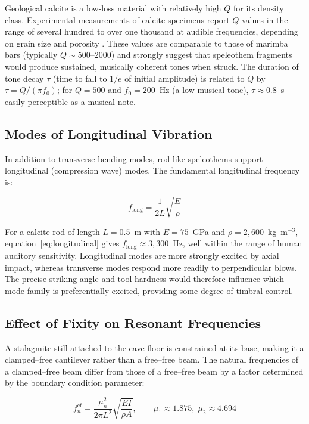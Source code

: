 \documentclass[12pt]{article}
\begin{document}
Geological calcite is a low-loss material with relatively high $Q$ for its density class. Experimental measurements of calcite specimens report $Q$ values in the range of several hundred to over one thousand at audible frequencies, depending on grain size and porosity \citep{Manghnani1974}. These values are comparable to those of marimba bars (typically $Q \sim 500$--$2000$) and strongly suggest that speleothem fragments would produce sustained, musically coherent tones when struck. The duration of tone decay $\tau$ (time to fall to $1/e$ of initial amplitude) is related to $Q$ by $\tau = Q / (\pi f_0)$; for $Q = 500$ and $f_0 = 200$~Hz (a low musical tone), $\tau \approx 0.8$~s—easily perceptible as a musical note.

\subsection{Modes of Longitudinal Vibration}

In addition to transverse bending modes, rod-like speleothems support longitudinal (compression wave) modes. The fundamental longitudinal frequency is:

\begin{equation}
f_{\text{long}} = \frac{1}{2L}\sqrt{\frac{E}{\rho}} \label{eq:longitudinal}
\end{equation}

For a calcite rod of length $L = 0.5$~m with $E = 75$~GPa and $\rho = 2{,}600$~kg~m$^{-3}$, equation~\eqref{eq:longitudinal} gives $f_{\text{long}} \approx 3{,}300$~Hz, well within the range of human auditory sensitivity. Longitudinal modes are more strongly excited by axial impact, whereas transverse modes respond more readily to perpendicular blows. The precise striking angle and tool hardness would therefore influence which mode family is preferentially excited, providing some degree of timbral control.

\subsection{Effect of Fixity on Resonant Frequencies}

A stalagmite still attached to the cave floor is constrained at its base, making it a clamped--free cantilever rather than a free--free beam. The natural frequencies of a clamped--free beam differ from those of a free--free beam by a factor determined by the boundary condition parameter:

\begin{equation}
f_n^{\text{cf}} = \frac{\mu_n^2}{2\pi L^2}\sqrt{\frac{EI}{\rho A}}, \qquad \mu_1 \approx 1.875,\; \mu_2 \approx 4.694 \label{eq:cantilever}
\end{equation}
\end{document}
